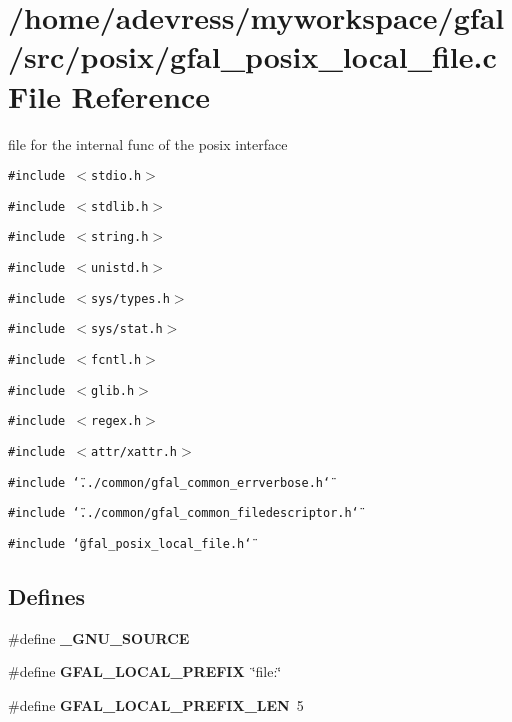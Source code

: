 \section{/home/adevress/myworkspace/gfal/src/posix/gfal\_\-posix\_\-local\_\-file.c File Reference}
\label{gfal__posix__local__file_8c}
file for the internal func of the posix interface 

{\tt \#include $<$stdio.h$>$}\par
{\tt \#include $<$stdlib.h$>$}\par
{\tt \#include $<$string.h$>$}\par
{\tt \#include $<$unistd.h$>$}\par
{\tt \#include $<$sys/types.h$>$}\par
{\tt \#include $<$sys/stat.h$>$}\par
{\tt \#include $<$fcntl.h$>$}\par
{\tt \#include $<$glib.h$>$}\par
{\tt \#include $<$regex.h$>$}\par
{\tt \#include $<$attr/xattr.h$>$}\par
{\tt \#include \char`\"{}../common/gfal\_\-common\_\-errverbose.h\char`\"{}}\par
{\tt \#include \char`\"{}../common/gfal\_\-common\_\-filedescriptor.h\char`\"{}}\par
{\tt \#include \char`\"{}gfal\_\-posix\_\-local\_\-file.h\char`\"{}}\par
\subsection*{Defines}
\begin{CompactItemize}
\item 
\#define \textbf{\_\-GNU\_\-SOURCE}\label{gfal__posix__local__file_8c_53abf256730d533302d1910e5fb61efe}

\item 
\#define \textbf{GFAL\_\-LOCAL\_\-PREFIX}~\char`\"{}file:\char`\"{}\label{gfal__posix__local__file_8c_72e3f23638773071a6db4d9a354ccfdb}

\item 
\#define \textbf{GFAL\_\-LOCAL\_\-PREFIX\_\-LEN}~5\label{gfal__posix__local__file_8c_ff19b1b9a266e6b8e76d0262b53d7a1a}

\end{CompactItemize}
